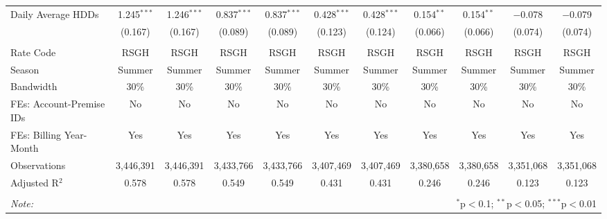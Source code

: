 \begin{table}[!htbp]
\begin{adjustbox}{scale = 0.75}
\begin{tabular}{@{\extracolsep{5pt}}lcccccccccc}
 Daily Average HDDs & 1.245$^{***}$ & 1.246$^{***}$ & 0.837$^{***}$ & 0.837$^{***}$ & 0.428$^{***}$ & 0.428$^{***}$ & 0.154$^{**}$ & 0.154$^{**}$ & $-$0.078 & $-$0.079 \\ 
  & (0.167) & (0.167) & (0.089) & (0.089) & (0.123) & (0.124) & (0.066) & (0.066) & (0.074) & (0.074) \\ 
\hline \\[-1.8ex] 
Rate Code & RSGH & RSGH & RSGH & RSGH & RSGH & RSGH & RSGH & RSGH & RSGH & RSGH \\ 
Season & Summer & Summer & Summer & Summer & Summer & Summer & Summer & Summer & Summer & Summer \\ 
Bandwidth & 30\% & 30\% & 30\% & 30\% & 30\% & 30\% & 30\% & 30\% & 30\% & 30\% \\ 
FEs: Account-Premise IDs & No & No & No & No & No & No & No & No & No & No \\ 
FEs: Billing Year-Month & Yes & Yes & Yes & Yes & Yes & Yes & Yes & Yes & Yes & Yes \\ 
Observations & 3,446,391 & 3,446,391 & 3,433,766 & 3,433,766 & 3,407,469 & 3,407,469 & 3,380,658 & 3,380,658 & 3,351,068 & 3,351,068 \\ 
Adjusted R$^{2}$ & 0.578 & 0.578 & 0.549 & 0.549 & 0.431 & 0.431 & 0.246 & 0.246 & 0.123 & 0.123 \\ 
\hline 
\hline \\[-1.8ex] 
\textit{Note:}  & \multicolumn{10}{r}{$^{*}$p$<$0.1; $^{**}$p$<$0.05; $^{***}$p$<$0.01} \\ 
\end{tabular}
\end{adjustbox}
\end{table} 
